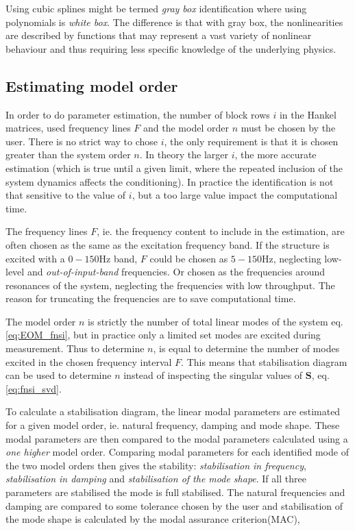 Using cubic splines might be termed \textit{gray box} identification where using
polynomials is \textit{white box}. The difference is that with gray box, the
nonlinearities are described by functions that may represent a vast variety of
nonlinear behaviour and thus requiring less specific knowledge of the underlying
physics.


\subsection{Estimating model order}

In order to do parameter estimation, the number of block rows $i$ in the Hankel
matrices, used frequency lines $F$ and the model order $n$ must be chosen by the
user.
There is no strict way to chose $i$, the only requirement is that it is chosen
greater than the system order $n$. In theory the larger $i$, the more accurate
estimation (which is true until a given limit, where the repeated inclusion of
the system dynamics affects the conditioning). In practice the identification is
not that sensitive to the value of $i$, but a too large value impact the
computational time.

The frequency lines $F$, ie. the frequency content to include in the estimation,
are often chosen as the same as the excitation frequency band. If the structure
is excited with a $0-150$Hz band, $F$ could be chosen as $5-150$Hz, neglecting
low-level and \textit{out-of-input-band} frequencies. Or chosen as the
frequencies around resonances of the system, neglecting the frequencies with low
throughput. The reason for truncating the frequencies are to save computational
time.

The model order $n$ is strictly the number of total linear modes of the system
eq. \eqref{eq:EOM_fnsi}, but in practice only a limited set modes are excited
during measurement. Thus to determine $n$, is equal to determine the number of
modes excited in the chosen frequency interval $F$.
This means that stabilisation diagram can be used to determine $n$ instead
of inspecting the singular values of $\bm S$, eq. \eqref{eq:fnsi_svd}.

To calculate a stabilisation diagram, the linear modal parameters are estimated
for a given model order, ie. natural frequency, damping and mode shape. These
modal parameters are then compared to the modal parameters calculated using a
\textit{one higher} model order.
Comparing modal parameters for each identified mode of the two model orders then
gives the stability: \textit{stabilisation in frequency}, \textit{stabilisation
  in damping} and \textit{stabilisation of the mode shape}. If all three
parameters are stabilised the mode is full stabilised. The natural frequencies
and damping are compared to some tolerance chosen by the user and stabilisation
of the mode shape is calculated by the modal assurance
criterion(MAC)\autocite{Allemang2003},

